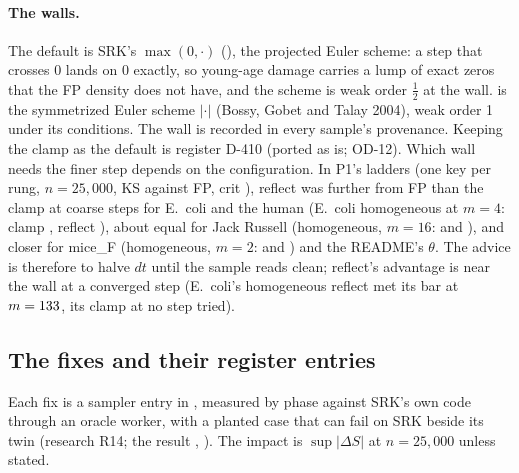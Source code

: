 \paragraph{The walls.} The default  is SRK's $\max(0,\cdot)$ (), the
projected Euler scheme: a step that crosses 0 lands on 0 exactly, so young-age damage carries a lump of exact zeros
that the FP density does not have, and the scheme is weak order $\frac12$ at the wall.  is the
symmetrized Euler scheme $|\cdot|$ (Bossy, Gobet and Talay 2004), weak order 1 under its conditions. The wall is
recorded in every sample's provenance. Keeping the clamp as the default is register D-410 (ported as is; OD-12).
Which wall needs the finer step depends on the configuration. In P1's ladders (one key per rung, $n=25{,}000$, KS
against FP, crit ), reflect was further from FP than the clamp at coarse
steps for E.~coli and the human (E.~coli homogeneous at $m=4$: clamp , reflect ), about equal for Jack Russell (homogeneous, $m=16$:
 and ), and closer for mice\_F
(homogeneous, $m=2$:  and )
and the README's $\theta$. The advice is therefore to halve $dt$ until the sample reads clean; reflect's advantage is
near the wall at a converged step (E.~coli's homogeneous reflect met its bar at
$m=\verify{tests/acceptance/results/p1_pooled_004.json}{frozen.ecoli|hom|reflect.m}{d}{133}$, its clamp at no step tried).

\subsection{The fixes and their register entries}\label{sec:lgv-fixes}

Each fix is a sampler entry in , measured by phase  against SRK's own code
through an oracle worker, with a planted case that can fail on SRK beside its twin (research R14; the result
,
). The impact is $\sup|\Delta S|$ at
$n=25{,}000$ unless stated.

